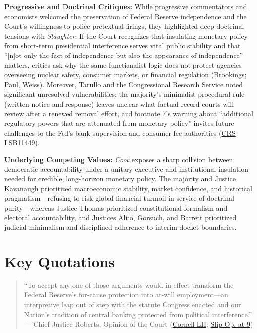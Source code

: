 \documentclass[12pt]{article}
\begin{document}
\textbf{Progressive and Doctrinal Critiques:} While progressive commentators and economists welcomed the preservation of Federal Reserve independence and the Court's willingness to police pretextual firings, they highlighted deep doctrinal tensions with \textit{Slaughter}. If the Court recognizes that insulating monetary policy from short-term presidential interference serves vital public stability and that ``[n]ot only the fact of independence but also the appearance of independence'' matters, critics ask why the same functionalist logic does not protect agencies overseeing nuclear safety, consumer markets, or financial regulation (\href{https://www.brookings.edu/articles/fed-independence-after-trump-v-cook/}{Brookings}; \href{https://www.paulweiss.com/insights/client-memos/supreme-court-overrules-humphrey-s-executor-but-preserves-the-fed-s-independence}{Paul, Weiss}). Moreover, Tarullo and the Congressional Research Service noted significant unresolved vulnerabilities: the majority's minimalist procedural rule (written notice and response) leaves unclear what factual record courts will review after a renewed removal effort, and footnote 7's warning about ``additional regulatory powers that are attenuated from monetary policy'' invites future challenges to the Fed's bank-supervision and consumer-fee authorities (\href{https://www.everycrsreport.com/reports/LSB11449.html}{CRS LSB11449}).

\textbf{Underlying Competing Values:} \textit{Cook} exposes a sharp collision between democratic accountability under a unitary executive and institutional insulation needed for credible, long-horizon monetary policy. The majority and Justice Kavanaugh prioritized macroeconomic stability, market confidence, and historical pragmatism---refusing to risk global financial turmoil in service of doctrinal purity---whereas Justice Thomas prioritized constitutional formalism and electoral accountability, and Justices Alito, Gorsuch, and Barrett prioritized judicial minimalism and disciplined adherence to interim-docket boundaries.

\section{Key Quotations}

\begin{quote}
``To accept any one of those arguments would in effect transform the Federal Reserve's for-cause protection into at-will employment---an interpretive leap out of step with the statute Congress enacted and our Nation's tradition of central banking protected from political interference.'' \\
--- Chief Justice Roberts, Opinion of the Court (\href{https://www.law.cornell.edu/supremecourt/text/25A312}{Cornell LII}; \href{https://www.supremecourt.gov/opinions/25pdf/25a312_5468.pdf}{Slip Op. at 9})
\end{quote}
\end{document}
